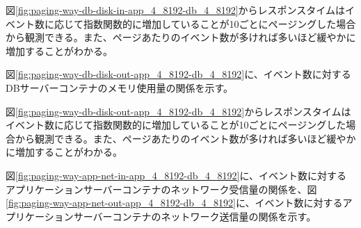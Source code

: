 \documentclass[../../../../main]{subfiles}
\begin{document}
    

    図\ref{fig:paging-way-db-disk-in-app_4_8192-db_4_8192}からレスポンスタイムはイベント数に応じて指数関数的に増加していることが10ごとにページングした場合から観測できる。また、ページあたりのイベント数が多ければ多いほど緩やかに増加することがわかる。

    図\ref{fig:paging-way-db-disk-out-app_4_8192-db_4_8192}に、イベント数に対するDBサーバーコンテナのメモリ使用量の関係を示す。

    

    図\ref{fig:paging-way-db-disk-out-app_4_8192-db_4_8192}からレスポンスタイムはイベント数に応じて指数関数的に増加していることが10ごとにページングした場合から観測できる。また、ページあたりのイベント数が多ければ多いほど緩やかに増加することがわかる。

    \label{subsubsubsec:result-paging-way-only-limit-net-io}

    図\ref{fig:paging-way-app-net-in-app_4_8192-db_4_8192}に、イベント数に対するアプリケーションサーバーコンテナのネットワーク受信量の関係を、図\ref{fig:paging-way-app-net-out-app_4_8192-db_4_8192}に、イベント数に対するアプリケーションサーバーコンテナのネットワーク送信量の関係を示す。

    
    
\end{document}
